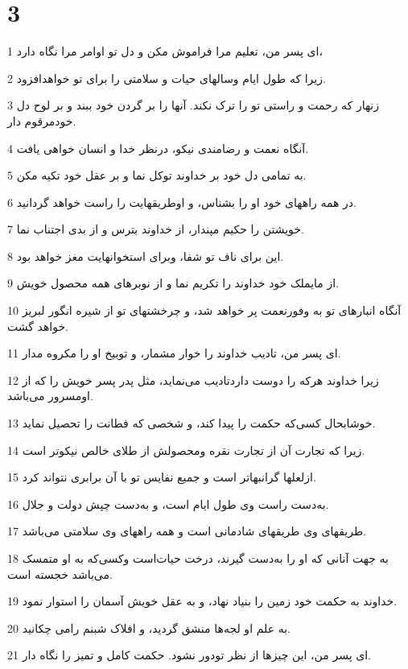 \chapter{3}

\par 1 ای پسر من، تعلیم مرا فراموش مکن و دل تو اوامر مرا نگاه دارد،
\par 2 زیرا که طول ایام وسالهای حیات و سلامتی را برای تو خواهدافزود.
\par 3 زنهار که رحمت و راستی تو را ترک نکند. آنها را بر گردن خود ببند و بر لوح دل خودمرقوم دار.
\par 4 آنگاه نعمت و رضامندی نیکو، درنظر خدا و انسان خواهی یافت.
\par 5 به تمامی دل خود بر خداوند توکل نما و بر عقل خود تکیه مکن.
\par 6 در همه راههای خود او را بشناس، و اوطریقهایت را راست خواهد گردانید.
\par 7 خویشتن را حکیم مپندار، از خداوند بترس و از بدی اجتناب نما.
\par 8 این برای ناف تو شفا، وبرای استخوانهایت مغز خواهد بود.
\par 9 از مایملک خود خداوند را تکریم نما و از نوبرهای همه محصول خویش.
\par 10 آنگاه انبارهای تو به وفورنعمت پر خواهد شد، و چرخشتهای تو از شیره انگور لبریز خواهد گشت.
\par 11 ‌ای پسر من، تادیب خداوند را خوار مشمار، و توبیخ او را مکروه مدار.
\par 12 زیرا خداوند هر‌که را دوست داردتادیب می‌نماید، مثل پدر پسر خویش را که از اومسرور می‌باشد.
\par 13 خوشابحال کسی‌که حکمت را پیدا کند، و شخصی که فطانت را تحصیل نماید.
\par 14 زیرا که تجارت آن از تجارت نقره ومحصولش از طلای خالص نیکوتر است.
\par 15 ازلعلها گرانبهاتر است و جمیع نفایس تو با آن برابری نتواند کرد.
\par 16 به‌دست راست وی طول ایام است، و به‌دست چپش دولت و جلال.
\par 17 طریقهای وی طریقهای شادمانی است و همه راههای وی سلامتی می‌باشد.
\par 18 به جهت آنانی که او را به‌دست گیرند، درخت حیات‌است وکسی‌که به او متمسک می‌باشد خجسته است.
\par 19 خداوند به حکمت خود زمین را بنیاد نهاد، و به عقل خویش آسمان را استوار نمود.
\par 20 به علم او لجه‌ها منشق گردید، و افلاک شبنم رامی چکانید.
\par 21 ‌ای پسر من، این چیزها از نظر تودور نشود. حکمت کامل و تمیز را نگاه دار.
